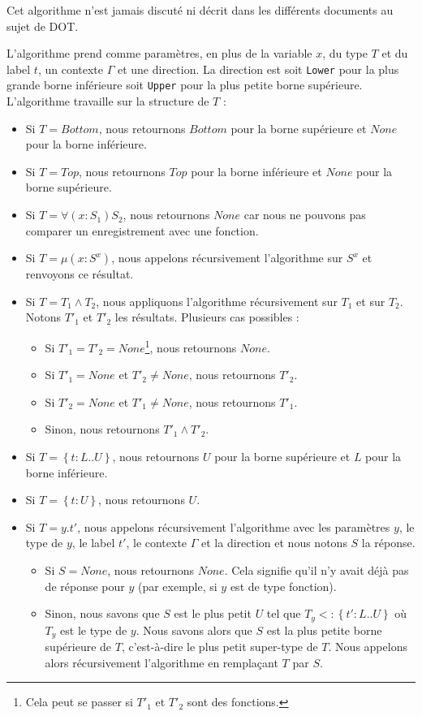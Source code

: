 Cet algorithme n'est jamais discuté ni décrit dans les différents
documents au sujet de DOT.

L'algorithme prend comme
paramètres, en plus de la variable $x$, du type $T$ et du label $t$, un contexte
$\Gamma$ et une direction. La direction est soit \verb|Lower| pour la
plus grande borne inférieure soit \verb|Upper| pour la plus petite borne
supérieure. L'algorithme travaille sur la structure de $T$ :

\begin{itemize}
\item Si $T = Bottom$, nous retournons $Bottom$ pour la borne supérieure et
  $None$ pour la borne inférieure.
\item Si $T = Top$, nous retournons $Top$ pour la borne inférieure et
  $None$ pour la borne supérieure.
\item Si $T = \forall(x : S_{1}) S_{2}$, nous retournons $None$ car nous
  ne pouvons pas comparer un enregistrement avec une fonction.
\item Si $T = \mu(x : S^{x})$, nous appelons récursivement l'algorithme sur
  $S^{x}$ et renvoyons ce résultat.
\item Si $T = T_{1} \wedge T_{2}$, nous
  appliquons l'algorithme récursivement sur $T_{1}$ et sur $T_{2}$. Notons
  $T'_{1}$ et $T'_{2}$ les résultats. Plusieurs cas possibles :
  \begin{itemize}
  \item Si $T'_{1} = T'_{2} = None$\footnote{Cela peut se
    passer si $T'_{1}$ et $T'_{2}$ sont des fonctions.}, nous retournons $None$.
  \item Si $T'_{1} = None$ et $T'_{2} \neq None$, nous retournons $T'_{2}$.
  \item Si $T'_{2} = None$ et $T'_{1} \neq None$, nous retournons $T'_{1}$.
  \item Sinon, nous retournons $T'_{1} \wedge T'_{2}$.
  \end{itemize}
\item Si $T = \left\{ t : L .. U \right\}$, nous retournons $U$ pour la borne
  supérieure et $L$ pour la borne inférieure.
\item Si $T = \left\{ t : U \right\}$, nous retournons $U$.
\item Si $T = y.t'$, nous appelons récursivement l'algorithme avec les paramètres
  $y$, le type de $y$, le label $t'$, le contexte $\Gamma$ et la direction et
  nous notons $S$ la réponse.
  \begin{itemize}
  \item Si $S = None$, nous retournons $None$. Cela signifie qu'il n'y avait déjà
  pas de réponse pour $y$ (par exemple, si $y$ est de type fonction).
  \item Sinon, nous savons que $S$ est le plus petit $U$ tel que $T_{y} <: \left\{ t'
    : L .. U \right\}$ où $T_{y}$ est le type de $y$. Nous savons alors que $S$
  est la plus petite borne supérieure de $T$, c'est-à-dire le plus petit super-type de $T$. Nous
  appelons alors récursivement l'algorithme en remplaçant $T$ par $S$.
  \end{itemize}
\end{itemize}

